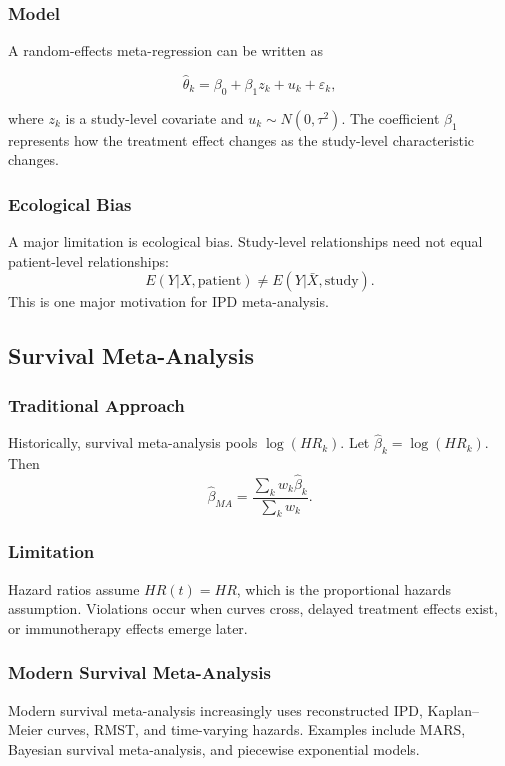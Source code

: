 \documentclass[11pt]{article}
\begin{document}
\subsubsection*{Model}

A random-effects meta-regression can be written as

\[\hat{\theta}_k=\beta_0+\beta_1z_k+u_k+\varepsilon_k,\]

where $z_k$ is a study-level covariate and $u_k\sim N(0,\tau^2)$.
The coefficient $\beta_1$ represents how the treatment effect changes as the study-level characteristic changes.

\subsubsection*{Ecological Bias}

A major limitation is ecological bias.
Study-level relationships need not equal patient-level relationships:
\[E(Y|X,\text{patient})\neq E(Y|\bar X,\text{study}).\]
This is one major motivation for IPD meta-analysis.

\subsection*{Survival Meta-Analysis}

\subsubsection*{Traditional Approach}

Historically, survival meta-analysis pools $\log(HR_k)$. Let $\hat{\beta}_k=\log(HR_k)$. Then
\[\hat{\beta}_{MA}=\frac{\sum_k w_k\hat{\beta}_k}{\sum_k w_k}.\]

\subsubsection*{Limitation}

Hazard ratios assume $HR(t)=HR$, which is the proportional hazards assumption.
Violations occur when curves cross, delayed treatment effects exist, or immunotherapy effects emerge later.

\subsubsection*{Modern Survival Meta-Analysis}

Modern survival meta-analysis increasingly uses reconstructed IPD, Kaplan--Meier curves, RMST, and time-varying hazards.
Examples include MARS, Bayesian survival meta-analysis, and piecewise exponential models.
\end{document}
